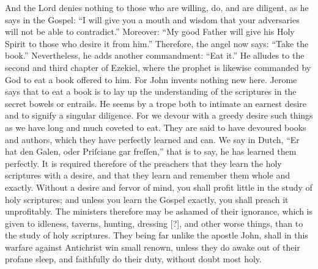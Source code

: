 And the Lord denies nothing to those who are willing, do, and are diligent, as he says in the Gospel: “I will give you a mouth and wisdom that your adversaries will not be able to contradict.” Moreover: “My good Father will give his Holy Spirit to those who desire it from him.” Therefore, the angel now says: “Take the book.” Nevertheless, he adds another commandment: “Eat it.” He alludes to the second and third chapter of Ezekiel, where the prophet is likewise commanded by God to eat a book offered to him. For John invents nothing new here. Jerome says that to eat a book is to lay up the understanding of the scriptures in the secret bowels or entrails. He seems by a trope both to intimate an earnest desire and to signify a singular diligence. For we devour with a greedy desire such things as we have long and much coveted to eat. They are said to have devoured books and authors, which they have perfectly learned and can. We say in Dutch, “Er hat den Galen, oder Priſciane gar freſſen,” that is to say, he has learned them perfectly. It is required therefore of the preachers that they learn the holy scriptures with a desire, and that they learn and remember them whole and exactly. Without a desire and fervor of mind, you shall profit little in the study of holy scriptures; and unless you learn the Gospel exactly, you shall preach it unprofitably. The ministers therefore may be ashamed of their ignorance, which is given to idleness, taverns, hunting, dressing [?], and other worse things, than to the study of holy scriptures. They being far unlike the apostle John, shall in this warfare against Antichrist win small renown, unless they do awake out of their profane sleep, and faithfully do their duty, without doubt most holy.

